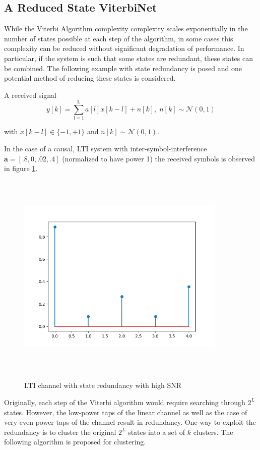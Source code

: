 \documentclass[12pt,a4paper]{report}
\begin{document}
\subsection{A Reduced State ViterbiNet}
While the Viterbi Algorithm complexity complexity scales exponentially in the number of states possible at each step of the algorithm, in some cases this complexity can be reduced without significant degradation of performance. In particular, if the system is such that some states are redundant, these states can be combined. The following example with state redundancy is posed and one potential method of reducing these states is considered. 

A received signal 
\begin{equation}
y[k] = \sum_{\mathrm{l=1}}^{\mathrm{L}} a[l]x[k-l] + n[k], \; n[k]  \sim \mathcal{N}(0,1)
\end{equation}

with $x[k-l] \in \{ -1, +1\}$ and $n[k]  \sim \mathcal{N}(0,1)$.  

In the case of a causal, LTI system with inter-symbol-interference $\mathbf{a} = [.8,0,.02,.4]$ (normalized to have power 1) the received symbols is observed in figure \ref{fig:redundant_channel}. 

\begin{figure}[H]
	\includegraphics[width=10cm,height = 10cm]{system_model/lti_channel}
	  \label{fig:redundant_channel}
	  	  \caption{LTI channel with state redundancy with high SNR}
\end{figure}

Originally, each step of the Viterbi algorithm would require searching through $2^L$ states. However, the low-power taps of the linear channel as well as the case of very even power taps of the channel result in redundancy. One way to exploit the redundancy is to cluster the original $2^L$ states into a set of $k$ clusters. The following algorithm is proposed for clustering.
\end{document}
